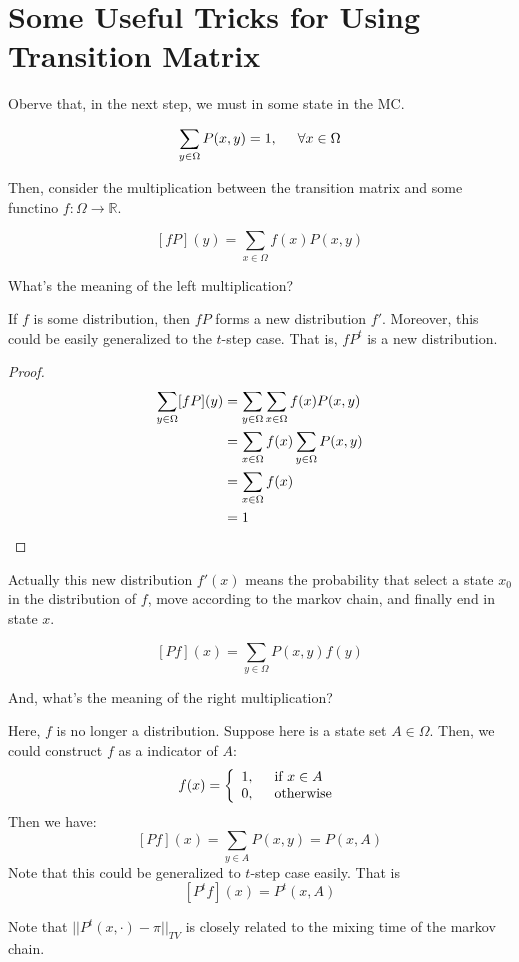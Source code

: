 \section{Some Useful Tricks for Using Transition Matrix}
Oberve that, in the next step, we must in some state in the MC. 
\begin{proposition}[Normality]
  \[
    \sum_{y\in\Omega} P(x, y) = 1,\hspace{0.5cm} \forall x\in\Omega
  \]
\end{proposition}
Then, consider the multiplication between the transition matrix and some functino $f:\Omega \to \mathbb{R}$.
\begin{define}
  \[[fP](y) = \sum_{x\in\Omega}f(x)P(x,y)\]
\end{define}
What's the meaning of the left multiplication?
\begin{proposition}
If $f$ is some distribution, then $fP$ forms a new distribution $f'$. 
\tcblower
Moreover, this could be easily generalized to the $t$-step case. That is, $fP^t$ is a new distribution.
\end{proposition}
\begin{proof}
  \begin{align*}
    \sum_{y\in\Omega} [fP](y)
    &= \sum_{y\in\Omega}\sum_{x\in\Omega} f(x)P(x,y)\\
    &= \sum_{x\in\Omega}f(x)\sum_{y\in\Omega}P(x,y) \\
    &= \sum_{x\in\Omega}f(x) \\
    &= 1 \qedhere
  \end{align*}
\end{proof}
Actually this new distribution $f'(x)$ means the probability that select a state $x_0$ in the distribution of $f$, move according to the markov chain, and finally end in state $x$.

\begin{define}
  \[[Pf](x) = \sum_{y\in\Omega}P(x,y)f(y)\]
\end{define}
And, what's the meaning of the right multiplication?
\begin{proposition}
  Here, $f$ is no longer a distribution. Suppose here is a state set $A\in\Omega$. Then, we could construct $f$ as a indicator of $A$:
  \[
    f(x) = \left\{
      \begin{array}{l}
        1, \hspace{0.5cm} \mbox{if $x\in A$} \\
        0, \hspace{0.5cm} \mbox{otherwise}
      \end{array}
    \right.
  \]
  Then we have:
  \[
    [Pf](x) = \sum_{y\in A}P(x,y) = P(x, A)
  \]
  \tcblower
  Note that this could be generalized to $t$-step case easily. That is
  \[
    [P^tf](x) = P^t(x,A)
  \]
\end{proposition}
Note that $||P^t(x,\cdot) - \pi||_{TV}$ is closely related to the mixing time of the markov chain.
